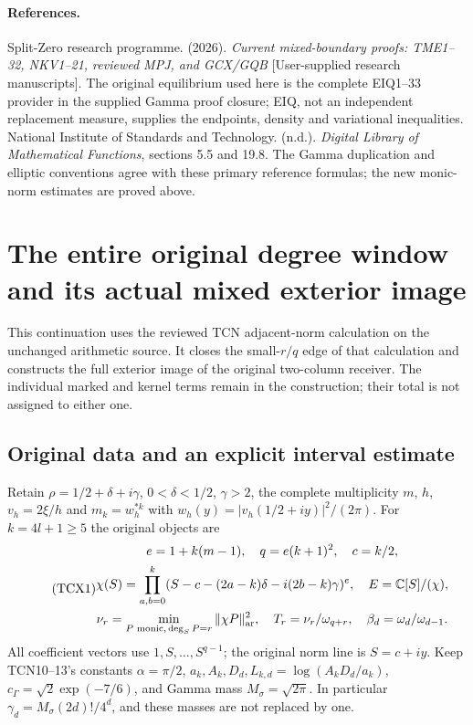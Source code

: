 \documentclass[11pt,a4paper]{article}
\begin{document}
\paragraph{References.}
Split-Zero research programme. (2026). \emph{Current mixed-boundary
proofs: TME1--32, NKV1--21, reviewed MPJ, and GCX/GQB} [User-supplied
research manuscripts]. The original equilibrium used here is the
complete EIQ1--33 provider in the supplied Gamma proof closure;
EIQ, not an independent replacement measure, supplies the endpoints,
density and variational inequalities.\\
National Institute of Standards and Technology. (n.d.).
\emph{Digital Library of Mathematical Functions}, sections 5.5 and 19.8.
The Gamma duplication and elliptic conventions agree with these primary
reference formulas; the new monic-norm estimates are proved above.
\endgroup


\clearpage
\begingroup
\section{The entire original degree window and its actual mixed exterior image}
\label{sec:TCX}

This continuation uses the reviewed TCN adjacent-norm calculation on
the unchanged arithmetic source. It closes the small-$r/q$ edge of
that calculation and constructs the full exterior image of the
original two-column receiver. The individual marked and kernel terms
remain in the construction; their total is not assigned to either one.

\subsection{Original data and an explicit interval estimate}

Retain $\rho=1/2+\delta+i\gamma$, $0<\delta<1/2$, $\gamma>2$,
the complete multiplicity $m$, $h$, $v_h=2\xi/h$ and
$m_k=w_h^{*k}$ with $w_h(y)=|v_h(1/2+iy)|^2/(2\pi)$.
For $k=4l+1\ge5$ the original objects are
\begin{equation}\tag{TCX1}
\begin{gathered}
 e=1+k(m-1),\quad q=e(k+1)^2,\quad c=k/2,\\
 \chi(S)=\prod_{a,b=0}^k
  (S-c-(2a-k)\delta-i(2b-k)\gamma)^e,
 \quad E=\mathbb C[S]/(\chi),\\
 \nu_r=\min_{P\text{ monic},\,\deg_SP=r}\|\chi P\|_{\rm ar}^2,
 \quad T_r=\nu_r/\omega_{q+r},\quad
 \beta_d=\omega_d/\omega_{d-1}.
\end{gathered}
\end{equation}
All coefficient vectors use $1,S,\ldots,S^{q-1}$; the original
norm line is $S=c+iy$. Keep TCN10--13's constants
$\alpha=\pi/2$, $a_k,A_k,D_d,L_{k,d}=\log(A_kD_d/a_k)$,
$c_\Gamma=\sqrt2\exp(-7/6)$, and Gamma mass
$M_\sigma=\sqrt{2\pi}$. In particular
$\gamma_d=M_\sigma(2d)!/4^d$, and these masses are not replaced by one.
\end{document}
